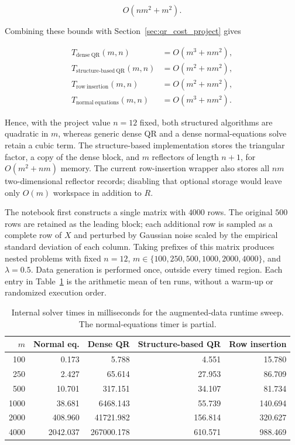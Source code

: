 \begin{equation}
    O(nm^2 + m^2).
\end{equation}

\noindent Combining these bounds with Section~\ref{sec:qr_cost_project} gives

\begin{equation}
\label{eq:qr_scaling_summary}
\begin{aligned}
    T_{\mathrm{dense\ QR}}(m,n) &= O(m^3+nm^2),\\
    T_{\mathrm{structure\text{-}based\ QR}}(m,n) &= O(m^2+nm^2),\\
    T_{\mathrm{row\ insertion}}(m,n) &= O(m^2+nm^2),\\
    T_{\mathrm{normal\ equations}}(m,n) &= O(m^3+nm^2).
\end{aligned}
\end{equation}

\noindent Hence, with the project value $n=12$ fixed, both structured algorithms are quadratic in $m$, whereas generic dense QR and a dense normal-equations solve retain a cubic term. The structure-based implementation stores the triangular factor, a copy of the dense block, and $m$ reflectors of length $n+1$, for $O(m^2+nm)$ memory. The current row-insertion wrapper also stores all $nm$ two-dimensional reflector records; disabling that optional storage would leave only $O(m)$ workspace in addition to $R$.

\noindent The notebook first constructs a single matrix with $4000$ rows. The original $500$ rows are retained as the leading block; each additional row is sampled as a complete row of $X$ and perturbed by Gaussian noise scaled by the empirical standard deviation of each column. Taking prefixes of this matrix produces nested problems with fixed $n=12$, $m\in\{100,250,500,1000,2000,4000\}$, and $\lambda=0.5$. Data generation is performed once, outside every timed region. Each entry in Table~\ref{tab:qr_runtime_scaling} is the arithmetic mean of ten runs, without a warm-up or randomized execution order.

\begin{table}[H]
\centering
\caption{Internal solver times in milliseconds for the augmented-data runtime
sweep. The normal-equations timer is partial.}
\label{tab:qr_runtime_scaling}
\small
\setlength{\tabcolsep}{5pt}
\begin{tabular}{rrrrr}
    \toprule
    $m$ & \textbf{Normal eq.} & \textbf{Dense QR}
        & \textbf{Structure-based QR} & \textbf{Row insertion}\\
    \midrule
     100 &    0.173 &      5.788 &   4.551 &  15.780\\
     250 &    2.427 &     65.614 &  27.953 &  86.709\\
     500 &   10.701 &    317.151 &  34.107 &  81.734\\
    1000 &   38.681 &   6468.143 &  55.739 & 140.694\\
    2000 &  408.960 &  41721.982 & 156.814 & 320.627\\
    4000 & 2042.037 & 267000.178 & 610.571 & 988.469\\
    \bottomrule
\end{tabular}
\end{table}

